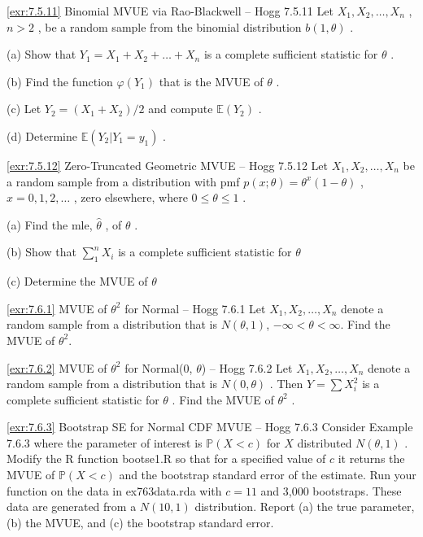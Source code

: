 \begin{exercise}{\ref{exr:7.5.11} Binomial MVUE via Rao-Blackwell – Hogg 7.5.11}\label{exr:7.5.11}
Let $X_{1}, X_{2}, \ldots, X_{n}$ , $n > 2$ , be a random sample from the binomial distribution $b(1, \theta)$ .

(a) Show that $Y_{1} = X_{1} + X_{2} + \dots + X_{n}$ is a complete sufficient statistic for $\theta$ .

(b) Find the function $\varphi(Y_1)$ that is the MVUE of $\theta$ .

(c) Let $Y_{2} = (X_{1} + X_{2}) / 2$ and compute $\mathbb{E}(Y_{2})$ .

(d) Determine $\mathbb{E}(Y_{2}|Y_{1} = y_{1})$ .
\end{exercise}

\begin{exercise}{\ref{exr:7.5.12} Zero-Truncated Geometric MVUE – Hogg 7.5.12}\label{exr:7.5.12}
Let $X_1, X_2, \ldots, X_n$ be a random sample from a distribution with pmf $p(x; \theta) = \theta^x (1 - \theta)$ , $x = 0, 1, 2, \ldots$ , zero elsewhere, where $0 \leq \theta \leq 1$ .

(a) Find the mle, $\hat{\theta}$ , of $\theta$ .

(b) Show that $\sum_{1}^{n}X_{i}$ is a complete sufficient statistic for $\theta$

(c) Determine the MVUE of $\theta$
\end{exercise}

\begin{exercise}{\ref{exr:7.6.1} MVUE of $\theta^{2}$ for Normal – Hogg 7.6.1}\label{exr:7.6.1}
Let $X_{1}, X_{2}, \ldots, X_{n}$ denote a random sample from a distribution that is $N(\theta, 1)$, $-\infty < \theta < \infty$. Find the MVUE of $\theta^{2}$.
\end{exercise}

\begin{exercise}{\ref{exr:7.6.2} MVUE of $\theta^{2}$ for Normal(0, $\theta$) – Hogg 7.6.2}\label{exr:7.6.2}
Let $X_{1}, X_{2}, \ldots, X_{n}$ denote a random sample from a distribution that is $N(0, \theta)$ . Then $Y = \sum X_{i}^{2}$ is a complete sufficient statistic for $\theta$ . Find the MVUE of $\theta^{2}$ .
\end{exercise}

\begin{exercise}{\ref{exr:7.6.3} Bootstrap SE for Normal CDF MVUE – Hogg 7.6.3}\label{exr:7.6.3}
Consider Example 7.6.3 where the parameter of interest is $\mathbb{P}(X < c)$ for $X$ distributed $N(\theta, 1)$ . Modify the R function bootse1.R so that for a specified value of $c$ it returns the MVUE of $\mathbb{P}(X < c)$ and the bootstrap standard error of the estimate. Run your function on the data in ex763data.rda with $c = 11$ and 3,000 bootstraps. These data are generated from a $N(10,1)$ distribution. Report (a) the true parameter, (b) the MVUE, and (c) the bootstrap standard error.
\end{exercise}

